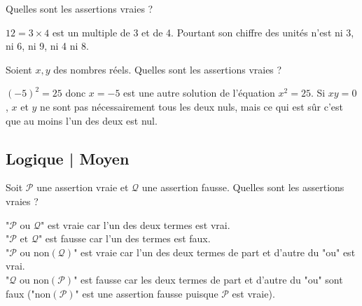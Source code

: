 \begin{question}
Quelles sont les assertions vraies ?	
\begin{answers} 
\end{answers}
\begin{explanations} 
$12 = 3\times 4$ est un multiple de 3 et de 4. Pourtant son chiffre des unités n'est ni 3, ni 6, ni 9, ni 4 ni 8. 
\end{explanations}
\end{question}


\begin{question}
Soient $x,y$ des nombres réels. Quelles sont les assertions vraies ?
\begin{answers} 
\end{answers}
\begin{explanations} 
$(-5)^2=25$ donc $x=-5$ est une autre solution de l'équation $x^2=25$.
Si $xy=0$, $x$ et $y$ ne sont pas nécessairement tous les deux nuls, mais ce qui est sûr c'est que au moins l'un des deux est nul.
\end{explanations}
\end{question}


\subsection{Logique | Moyen}

\begin{question}
Soit $\mathcal{P}$ une assertion vraie et $\mathcal{Q}$ une assertion fausse.
Quelles sont les assertions vraies ?	
\begin{answers} 
\end{answers}
\begin{explanations} 
"$\mathcal{P} \text{ ou }\mathcal{Q}$" est vraie car l'un des deux termes est vrai.\\
"$\mathcal{P} \text{ et }\mathcal{Q}$" est fausse car l'un des termes est faux.\\
"$\mathcal{P} \text{ ou }\text{non}(\mathcal{Q})$" est vraie car l'un des deux termes de part et d'autre du "ou" est vrai.\\
"$\mathcal{Q} \text{ ou }\text{non}(\mathcal{P})$" est fausse car les deux termes de part et d'autre du "ou" sont faux ("$\text{non}(\mathcal{P})$" est une assertion fausse puisque $\mathcal{P}$ est vraie).
\end{explanations}
\end{question}


